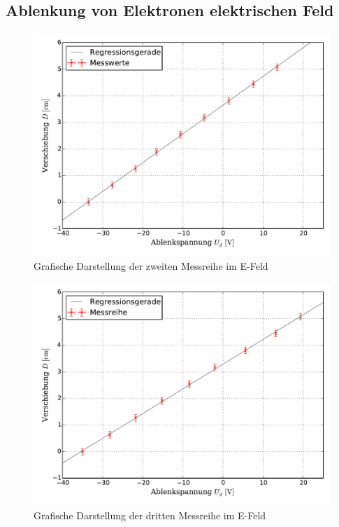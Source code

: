 	\subsection{Ablenkung von Elektronen elektrischen Feld}
		\begin{figure}[!h]
		\centering
				\includegraphics[scale=0.6]{Grafiken/EFeld_Messreihe_II.pdf}
				\caption{Grafische Darstellung der zweiten Messreihe im E-Feld}\label{fig:Auswertung_Messdaten_I_II}
		\end{figure}
		
		\begin{figure}[!h]
		\centering
				\includegraphics[scale=0.6]{Grafiken/EFeld_Messreihe_III.pdf}
				\caption{Grafische Darstellung der dritten Messreihe im E-Feld}\label{fig:Auswertung_Messdaten_I_III}
		\end{figure}
		
